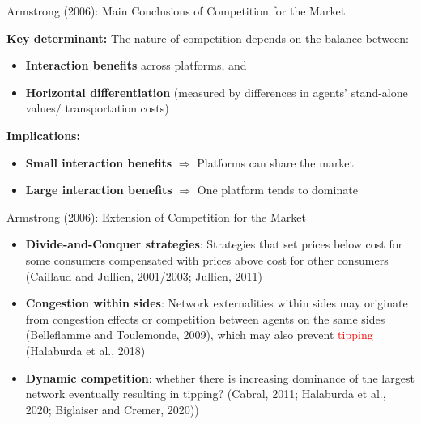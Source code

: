 \documentclass[aspectratio=169]{beamer}  %
\begin{document}
\begin{frame}{Armstrong (2006): Main Conclusions of Competition for the Market}
    \justifying  %
    
    \textbf{Key determinant:}  
    The nature of competition depends on the balance between:
    \begin{itemize}
        \item \textbf{Interaction benefits} across platforms, and
        \item \textbf{Horizontal differentiation} (measured by differences in agents’ stand-alone values/ transportation costs)
    \end{itemize}
    
    \vspace{0.5em}
    
    \textbf{Implications:}
    \begin{itemize}
        \item \textbf{Small interaction benefits} $\Rightarrow$ Platforms can share the market
        \item \textbf{Large interaction benefits} $\Rightarrow$ One platform tends to dominate
    \end{itemize}
    
    \vspace{0.5em}
  
\end{frame}

\begin{frame}{Armstrong (2006): Extension of Competition for the Market}
    \justifying  %
    
    \begin{itemize}
        \item \textbf{Divide-and-Conquer strategies}: Strategies that set prices below cost for some consumers compensated with prices above cost for other consumers (Caillaud and Jullien, 2001/2003; Jullien, 2011)
        \vspace{1em}
        \item \textbf{Congestion within sides}: Network externalities within sides may originate from congestion effects or competition between agents on the same sides (Belleflamme and Toulemonde, 2009), which may also prevent \textcolor{red}{tipping} (Halaburda et al., 2018)
        \vspace{1em}
        \item \textbf{Dynamic competition}: whether there is increasing dominance of the largest network eventually resulting in tipping? (Cabral, 2011; Halaburda et al., 2020; Biglaiser and Cremer, 2020))
    \end{itemize}
    
\end{frame}
\end{document}
